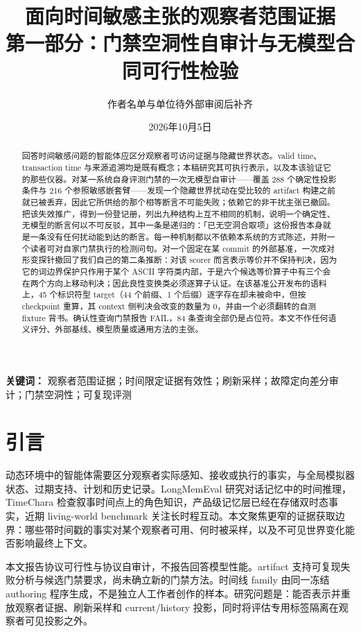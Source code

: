 \documentclass[UTF8,11pt]{ctexart}
\title{面向时间敏感主张的观察者范围证据\\\large 第一部分：门禁空洞性自审计与无模型合同可行性检验}
\author{作者名单与单位待外部审阅后补齐}
\date{2026年10月5日}
\begin{document}
\maketitle

\begin{abstract}
回答时间敏感问题的智能体应区分观察者可访问证据与隐藏世界状态。valid time、transaction time 与来源追溯均是既有概念；本稿研究其可执行表示，以及本该验证它的那些仪器。对某一系统自身评测门禁的一次无模型自审计——覆盖 288 个确定性投影条件与 216 个参照敏感嵌套臂——发现一个隐藏世界扰动在受比较的 artifact 构建之前就已被丢弃，因此它所供给的那个相等断言不可能失败；依赖它的非干扰主张已撤回。把该失效推广，得到一份登记册，列出九种结构上互不相同的机制，说明一个确定性、无模型的断言何以不可反驳，其中一条是递归的：「已无空洞合取项」这份报告本身就是一条没有任何扰动能到达的断言。每一种机制都以不依赖本系统的方式陈述，并附一个读者可对自家门禁执行的检测问句。对一个固定在某 commit 的外部基准，一次成对形变探针撤回了我们自己的第二条推断：对该 scorer 而言表示等价并不保持判决，因为它的词边界保护只作用于某个 ASCII 字符类内部，于是六个候选等价算子中有三个会在两个方向上移动判决；因此良性变换类必须逐算子认证。在该基准公开发布的语料上，45 个标识符型 target（44 个前缀、1 个后缀）逐字存在却未被命中，但按 checkpoint 重算，其 context 侧判决会改变的数量为 0，并由一个必须翻转的自测 fixture 背书。确认性查询门禁报告 FAIL，84 条查询全部仍是占位符。本文不作任何语义评分、外部基线、模型质量或通用方法的主张。
\end{abstract}

\noindent\textbf{关键词：} 观察者范围证据；时间限定证据有效性；刷新采样；故障定向差分审计；门禁空洞性；可复现评测

\section{引言}
动态环境中的智能体需要区分观察者实际感知、接收或执行的事实，与全局模拟器状态、过期支持、计划和历史记录。LongMemEval 研究对话记忆中的时间推理，TimeChara 检查叙事时间点上的角色知识，产品级记忆层已经在存储双时态事实，近期 living-world benchmark 关注长时程互动。本文聚焦更窄的证据获取边界：哪些带时间戳的事实对某个观察者可用、何时被采样，以及不可见世界变化能否影响最终上下文。

本文报告协议可行性与协议自审计，不报告回答模型性能。artifact 支持可复现失败分析与候选门禁要求，尚未确立新的门禁方法。时间线 family 由同一冻结 authoring 程序生成，不是独立人工作者创作的样本。研究问题是：能否表示并重放观察者证据、刷新采样和 current/history 投影，同时将评估专用标签隔离在观察者可见投影之外。
\end{document}
